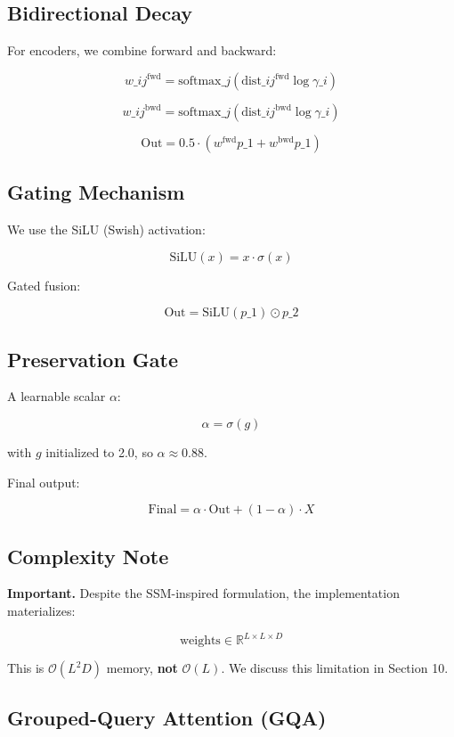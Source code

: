 \subsection{Bidirectional Decay}

For encoders, we combine forward and backward:

\[
w\_{ij}^\text{fwd} = \text{softmax}\_j(\text{dist}\_{ij}^\text{fwd} \log \gamma\_i)
\tag{3.10}
\]

\[
w\_{ij}^\text{bwd} = \text{softmax}\_j(\text{dist}\_{ij}^\text{bwd} \log \gamma\_i)
\tag{3.11}
\]

\[
\text{Out} = 0.5 \cdot (w^\text{fwd} p\_1 + w^\text{bwd} p\_1)
\tag{3.12}
\]

\subsection{Gating Mechanism}

We use the SiLU (Swish) activation:

\[
\text{SiLU}(x) = x \cdot \sigma(x)
\tag{3.13}
\]

Gated fusion:

\[
\text{Out} = \text{SiLU}(p\_1) \odot p\_2
\tag{3.14}
\]

\subsection{Preservation Gate}

A learnable scalar $\alpha$:

\[
\alpha = \sigma(g)
\tag{3.15}
\]

with $g$ initialized to 2.0, so $\alpha \approx 0.88$.

Final output:

\[
\text{Final} = \alpha \cdot \text{Out} + (1 - \alpha) \cdot X
\tag{3.16}
\]

\subsection{Complexity Note}

\textbf{Important.} Despite the SSM-inspired formulation, the implementation 
materializes:

\[
\text{weights} \in \mathbb{R}^{L \times L \times D}
\tag{3.17}
\]

This is $\mathcal{O}(L^2 D)$ memory, \textbf{not} $\mathcal{O}(L)$. We discuss 
this limitation in Section 10.

\subsection{Grouped-Query Attention (GQA)}

